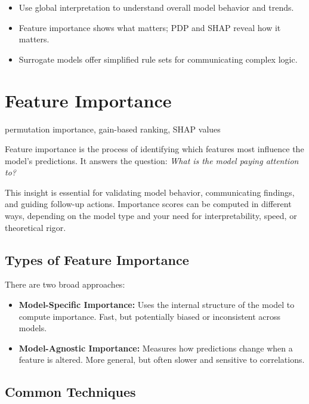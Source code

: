\documentclass[12pt,openany]{book}
\begin{document}
\begin{summarybox}
\begin{itemize}
  \item Use global interpretation to understand overall model behavior and trends.
  \item Feature importance shows what matters; PDP and SHAP reveal how it matters.
  \item Surrogate models offer simplified rule sets for communicating complex logic.
\end{itemize}
\end{summarybox}



\section{Feature Importance}

\begin{keywordsbox}
permutation importance, gain-based ranking, SHAP values
\end{keywordsbox}

Feature importance is the process of identifying which features most influence the model’s predictions. It answers the question: \textit{What is the model paying attention to?}

This insight is essential for validating model behavior, communicating findings, and guiding follow-up actions. Importance scores can be computed in different ways, depending on the model type and your need for interpretability, speed, or theoretical rigor.


\subsection{Types of Feature Importance}

There are two broad approaches:

\begin{itemize}
    \item \textbf{Model-Specific Importance:} Uses the internal structure of the model to compute importance. Fast, but potentially biased or inconsistent across models.
    \item \textbf{Model-Agnostic Importance:} Measures how predictions change when a feature is altered. More general, but often slower and sensitive to correlations.
\end{itemize}


\subsection{Common Techniques}
\end{document}
